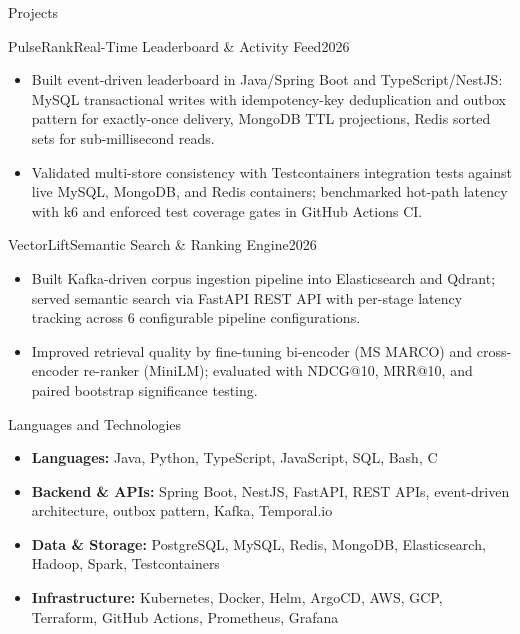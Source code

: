 \documentclass[]{mcdowellcv}
\begin{document}
\begin{cvsection}{Projects}
  \begin{cvsubsection}{PulseRank}{Real-Time Leaderboard \& Activity Feed}{2026}
    \begin{itemize}
      \item Built event-driven leaderboard in Java/Spring Boot and TypeScript/NestJS: MySQL transactional writes with idempotency-key deduplication and outbox pattern for exactly-once delivery, MongoDB TTL projections, Redis sorted sets for sub-millisecond reads.
      \item Validated multi-store consistency with Testcontainers integration tests against live MySQL, MongoDB, and Redis containers; benchmarked hot-path latency with k6 and enforced test coverage gates in GitHub Actions CI.
    \end{itemize}
    \vspace{-1.5pt}
  \end{cvsubsection}

  \begin{cvsubsection}{VectorLift}{Semantic Search \& Ranking Engine}{2026}
    \begin{itemize}
      \item Built Kafka-driven corpus ingestion pipeline into Elasticsearch and Qdrant; served semantic search via FastAPI REST API with per-stage latency tracking across 6 configurable pipeline configurations.
      \item Improved retrieval quality by fine-tuning bi-encoder (MS MARCO) and cross-encoder re-ranker (MiniLM); evaluated with NDCG@10, MRR@10, and paired bootstrap significance testing.
    \end{itemize}
  \end{cvsubsection}
\end{cvsection}

\begin{cvsection}{Languages and Technologies}
  \begin{cvsubsection}{}{}{}
    \begin{itemize}
      \item \textbf{Languages:} Java, Python, TypeScript, JavaScript, SQL, Bash, C
      \item \textbf{Backend \& APIs:} Spring Boot, NestJS, FastAPI, REST APIs, event-driven architecture, outbox pattern, Kafka, Temporal.io
      \item \textbf{Data \& Storage:} PostgreSQL, MySQL, Redis, MongoDB, Elasticsearch, Hadoop, Spark, Testcontainers
      \item \textbf{Infrastructure:} Kubernetes, Docker, Helm, ArgoCD, AWS, GCP, Terraform, GitHub Actions, Prometheus, Grafana
    \end{itemize}
  \end{cvsubsection}
\end{cvsection}
\end{document}
